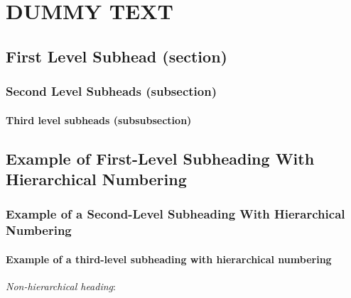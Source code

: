 \clearpage
\chapter{DUMMY TEXT}
\doublespacing

\lipsum[1-2] %

\section*{First Level Subhead (section)}
\lipsum[3-3] %

\subsection*{Second Level Subheads (subsection)}
\lipsum[4-5] %

\subsubsection*{Third level subheads (subsubsection)}
\lipsum[6-7] %

\section{Example of First-Level Subheading With Hierarchical Numbering}
\lipsum[8-8] %

\subsection{Example of a Second-Level Subheading With Hierarchical Numbering}
\lipsum[9-9] %

\subsubsection{Example of a third-level subheading with hierarchical numbering}
\lipsum[10-10] %

\textit{Non-hierarchical heading}: \lipsum[11-11]
\lipsum[11-11] %